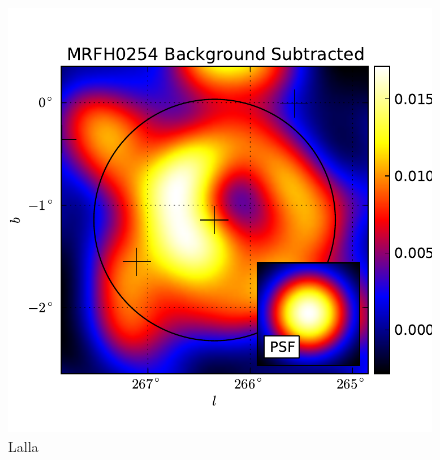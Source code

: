 \documentclass[preprint]{aastex}
\begin{document}
  \begin{figure}
    \begin{center}
      \includegraphics[type=pdf,ext=.pdf,read=.pdf]{source_plots/source_MRFH0254}
    \end{center}
    \caption{Lalla}
  \end{figure}
\end{document}
